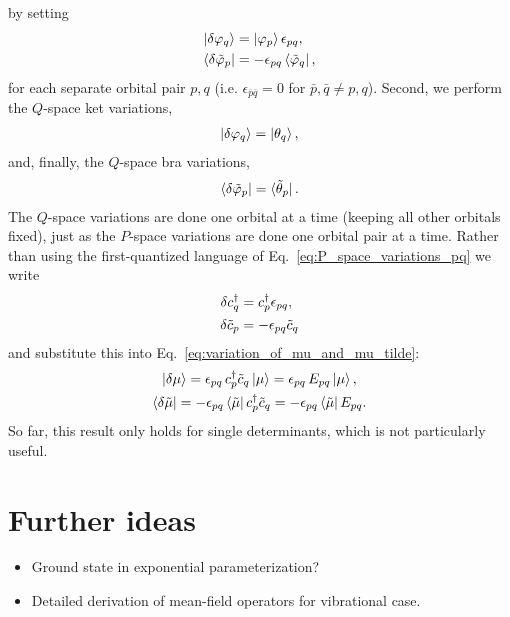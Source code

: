 \documentclass[aip,jcp,preprint,superscriptaddress,nofootinbib]{revtex4-1}
\begin{document}
by setting
\begin{subequations} \label{eq:P_space_variations_pq}
    \begin{align} 
        \ket{\delta\varphi_{q}} &= \ket{\varphi_{p}} \epsilon_{pq}, \\
        \bra{\delta\tilde{\varphi}_{p}} &= -\epsilon_{pq} \bra{\tilde{\varphi}_{q}},
    \end{align}
\end{subequations}
for each separate orbital pair $p,q$ (i.e. $\epsilon_{\bar{p} \bar{q}} = 0$ for $\bar{p}, \bar{q} \neq p, q$). Second, we perform the
$Q$-space ket variations,
\begin{align}
    \ket{\delta\varphi_{q}} = \ket{\theta_q},    
\end{align}
and, finally, the $Q$-space bra variations,
\begin{align}
    \bra{\delta\tilde{\varphi}_{p}} = \bra{\tilde{\theta}_p}.
\end{align}
The $Q$-space variations are done one orbital at a time (keeping all other orbitals fixed),
just as the $P$-space variations are done one orbital pair at a time.
Rather than using the first-quantized language of Eq.~\eqref{eq:P_space_variations_pq} we
write
\begin{subequations}
    \begin{align}
        \delta c^{\dagger}_{q} &= c^{\dagger}_{p} \epsilon_{pq}, \\
        \delta\tilde{c}_{p} &= -\epsilon_{pq} \tilde{c}_{q}
    \end{align}
\end{subequations}
and substitute this into Eq.~\eqref{eq:variation_of_mu_and_mu_tilde}:
\begin{subequations} \label{eq:variation_of_mu_and_mu_tilde_pq}
    \begin{gather}
        \ket{\delta \mu}         = \epsilon_{pq} \, c^{\dagger}_{p} \tilde{c}_{q} \ket{\mu}          = \epsilon_{pq} \,  E_{{p} {q}} \ket{\mu}  , \\
        \bra{\delta \tilde{\mu}} = -\epsilon_{pq} \bra{\tilde{\mu}} c^{\dagger}_{p} \tilde{c}_{q}  = -\epsilon_{pq} \bra{\tilde{\mu}} E_{{p} {q}} .
    \end{gather}
\end{subequations}
So far, this result only holds for single determinants, which is not particularly useful.



\section{Further ideas}
\begin{itemize}
    \item Ground state in exponential parameterization?
    \item Detailed derivation of mean-field operators for vibrational case.
\end{itemize}

\newpage

\end{document}
